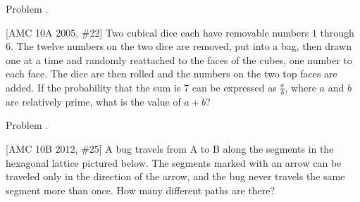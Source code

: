\documentclass[9pt]{beamer}
\newcounter{problem}[section]
\begin{document}
\begin{frame}[t, fragile]{Problem \thesection.\theproblem}
    \begin{block}{}[AMC 10A 2005, \#22]
    Two cubical dice each have removable numbers $1$ through $6$. The twelve numbers on the two dice are removed, put into a bag, then drawn one at a time and randomly reattached to the faces of the cubes, one number to each face. The dice are then rolled and the numbers on the two top faces are added. If the probability that the sum is $7$ can be expressed as $\frac{a}{b}$, where $a$ and $b$ are relatively prime, what is the value of $a+b$?
    
    \end{block}
\end{frame}
\begin{frame}[t, fragile]{Problem \thesection.\theproblem}
    \begin{block}{}[AMC 10B 2012, \#25]
    A bug travels from A to B along the segments in the hexagonal lattice pictured below. The segments marked with an arrow can be traveled only in the direction of the arrow, and the bug never travels the same segment more than once. How many different paths are there?
    \end{block}


\end{frame}
\end{document}
